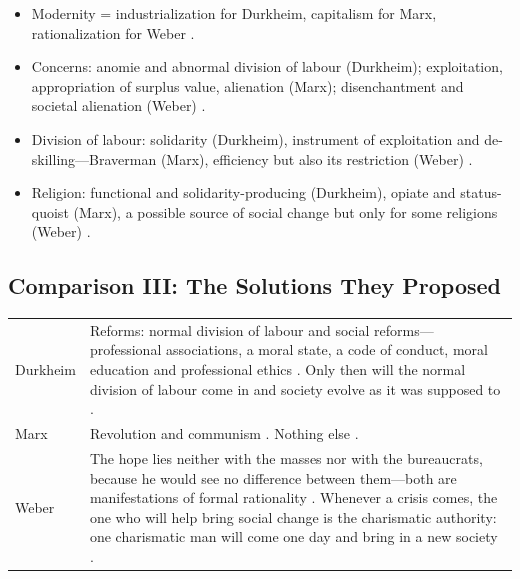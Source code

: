 \begin{QuickRevision}
\begin{itemize}
    \item Modernity = industrialization for Durkheim, capitalism for Marx, rationalization for Weber .
    \item Concerns: anomie and abnormal division of labour (Durkheim); exploitation, appropriation of surplus value, alienation (Marx); disenchantment and societal alienation (Weber) .
    \item Division of labour: solidarity (Durkheim), instrument of exploitation and de-skilling---Braverman (Marx), efficiency but also its restriction (Weber) .
    \item Religion: functional and solidarity-producing (Durkheim), opiate and status-quoist (Marx), a possible source of social change but only for some religions (Weber) .
\end{itemize}
\end{QuickRevision}

\subsection{Comparison III: The Solutions They Proposed}
\vspace{6pt}
\noindent
\begin{tabularx}{\textwidth}{>{\hsize}Y >{\hsize}Y}
\toprule
{}
 &  \\
\midrule
Durkheim & Reforms: normal division of labour and social reforms---professional associations, a moral state, a code of conduct, moral education and professional ethics . Only then will the normal division of labour come in and society evolve as it was supposed to . \\
\midrule
Marx & Revolution and communism . Nothing else . \\
\midrule
Weber & The hope lies neither with the masses nor with the bureaucrats, because he would see no difference between them---both are manifestations of formal rationality . Whenever a crisis comes, the one who will help bring social change is the charismatic authority: one charismatic man will come one day and bring in a new society . \\
\bottomrule
\end{tabularx}
\vspace{6pt}

